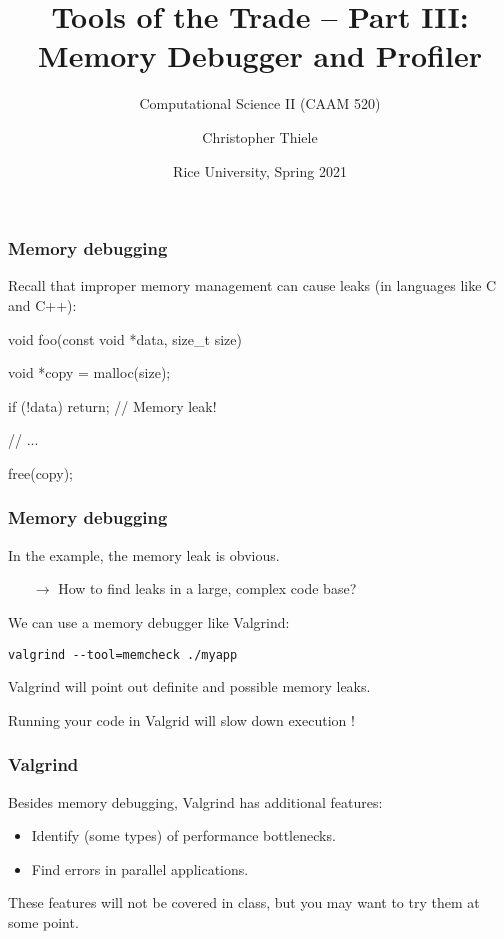 \documentclass[12pt,t]{beamer}
\let\emph\relax %
\newcommand{\conclude}[1]{%
  \begin{itemize}
    \item[$\rightarrow$]#1
  \end{itemize}
}
\newcommand{\cmd}[1]{\begin{center}\texttt{#1}\end{center}}
\begin{document}
  \title{Tools of the Trade -- Part III:\\Memory Debugger and Profiler}
  \subtitle{Computational Science II (CAAM 520)}
  \author{Christopher Thiele}
  \date{Rice University, Spring 2021}

  \begin{frame}
    \titlepage
  \end{frame}


  \begin{frame}[fragile]
    \frametitle{Memory debugging}

    Recall that improper memory management can cause leaks (in languages like C and C++):
    \begin{code}
void foo(const void *data, size_t size)
{
  void *copy = malloc(size);

  if (!data) {
    return; // Memory leak!
  }

  // ...

  free(copy);
}
    \end{code}
  \end{frame}

  \begin{frame}[fragile]
    \frametitle{Memory debugging}

    In the example, the memory leak is obvious.
    \conclude{How to find leaks in a large, complex code base?}

    We can use a memory debugger like Valgrind:
    \cmd{valgrind {-}-tool=memcheck ./myapp}

    Valgrind will point out definite and possible memory leaks.

    \emph{Note:} Running your code in Valgrid will slow down execution \emph{significantly}!
  \end{frame}

  \begin{frame}[fragile]
    \frametitle{Valgrind}

    Besides memory debugging, Valgrind has additional features:
    \begin{itemize}
      \item Identify (some types) of performance bottlenecks.
      \item Find errors in parallel applications.
    \end{itemize}

    These features will not be covered in class, but you may want to try them at some point.
  \end{frame}
\end{document}
